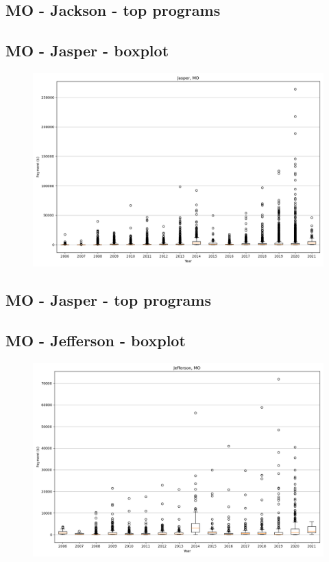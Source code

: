 \subsection*{MO - Jackson - top programs}

\newpage
\subsection*{MO - Jasper - boxplot}
\begin{figure}[h]
\centering
\includegraphics[width=7in]{../output/boxplots/counties/Jasper-MO_boxplot.png}
\end{figure}


\subsection*{MO - Jasper - top programs}

\newpage
\subsection*{MO - Jefferson - boxplot}
\begin{figure}[h]
\centering
\includegraphics[width=7in]{../output/boxplots/counties/Jefferson-MO_boxplot.png}
\end{figure}


